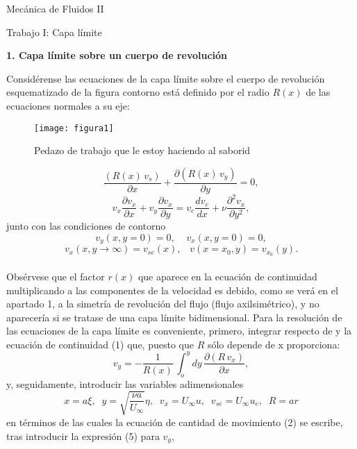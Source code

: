 \documentclass[11pt,a4paper]{article}
\begin{document}
\begin{center}
{\Huge Mecánica de Fluidos II}
\end{center}


\begin{center}
{\Large Trabajo I: Capa límite}
\end{center}
\begin{center}
{\Large  \textbf {1. Capa límite sobre un cuerpo de revolución}}
\end{center}
 
Considérense las ecuaciones de la capa límite sobre el cuerpo de revolución esquematizado de la figura contorno está definido por el radio $R(x)$ de las ecuaciones normales a su eje:



\begin{figure}[hb]
  \centering
  \texttt{[image: figura1]}
  \caption{Pedazo de trabajo que le estoy haciendo al saborid}
\end{figure}



\begin{equation}
\frac{(R(x)\, v_{s})}{\partial x} + \frac{\partial (R(x)\, v_{y})}{\partial y}=0,
\end{equation}
\begin{equation}
v_{x} \frac{\partial v_{x}}{\partial x} + v_{y} \frac{\partial v_{x}}{\partial y}= v_{e} \frac{d v_{e}}{d x} + \nu \frac{\partial^{2} v_{x}}{\partial y^{2}},
\end{equation}
junto con las condiciones de contorno
\begin{equation}
v_{y}(x,y=0)=0,\;\;\;\;v_{x}(x,y=0)=0,
\end{equation}
\begin{equation}
v_{x}(x,y\rightarrow \infty)=v_{se}(x), \;\;\; v(x=x_{0},y)=v_{x_{0}}(y).
\end{equation}
\\

Obsérvese que el factor $r(x)$ que aparece en la ecuación de continuidad multiplicando a las componentes de la velocidad es debido, como se verá en el apartado 1, a la simetría de revolución del flujo (flujo axilsimétrico), y no aparecería si se tratase de una capa límite bidimensional. Para la resolución de las ecuaciones de la capa límite es conveniente, primero, integrar respecto de y la ecuación de continuidad (1) que, puesto que $R$ sólo depende de x proporciona:
\begin{equation}
v_{y}=-\frac{1}{R(x)}\, \int_{o}^{y} dy\, \frac{\partial (R\, v_{x})}{\partial x},
\end{equation}
y, seguidamente, introducir las variables adimensionales
\begin{equation}
x=a\xi, \;\; y=\sqrt{\frac{\nu a}{U_{\infty}}}\eta, \;\; v_{x}=U_{\infty} u, \;\; v_{se}=U_{\infty} u_{e}, \;\; R=ar
\end{equation}
en términos de las cuales la ecuación de cantidad de movimiento (2) se escribe, tras introducir la expresión (5) para $v_{y}$,
\end{document}
